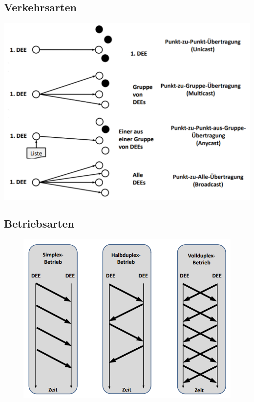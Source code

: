 \documentclass[12pt,a4paper]{article}
\begin{document}
		\subsection{Verkehrsarten}
			\includegraphics[width=\textwidth]{Bilder/Verkehrsarten.PNG}

		\subsection{Betriebsarten}
			\begin{center}
				\begin{figure}[!h]
					\includegraphics[scale=1]{Bilder/Duplexarten.PNG}
				\end{figure}
			\end{center}
\end{document}
